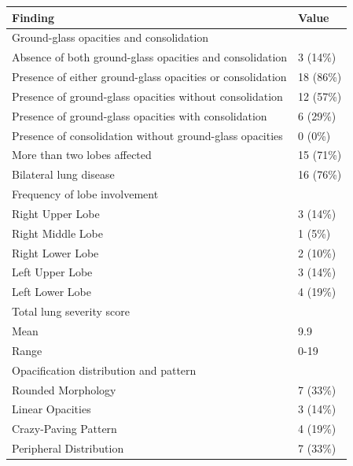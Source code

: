 \begin{longtable}{| p{} | p{} |} 
\hline
\textbf{Finding} & \textbf{Value} \\
\hline
Ground-glass opacities and consolidation & \\ \hline
\quad Absence of both ground-glass opacities and consolidation & 3 (14\%)\\ \hline
\quad Presence of either ground-glass opacities or consolidation & 18 (86\%)\\  \hline
\quad Presence of ground-glass opacities without consolidation & 12 (57\%)\\ \hline
\quad Presence of ground-glass opacities with consolidation & 6 (29\%)\\ \hline
\quad Presence of consolidation without ground-glass opacities & 0 (0\%)\\ \hline
More than two lobes affected & 15 (71\%)\\ \hline
Bilateral lung disease & 16 (76\%)\\ \hline
Frequency of lobe involvement & \\ \hline
\quad Right Upper Lobe & 3 (14\%)\\ \hline
\quad Right Middle Lobe & 1 (5\%)\\ \hline
\quad Right Lower Lobe & 2 (10\%)\\ \hline
\quad Left Upper Lobe & 3 (14\%)\\ \hline
\quad Left Lower Lobe & 4 (19\%)\\ \hline
Total lung severity score & \\ \hline
\quad Mean & 9.9\\ \hline
\quad Range & 0-19\\ \hline
Opacification distribution and pattern & \\ \hline
 \quad Rounded Morphology & 7 (33\%)\\ \hline
 \quad Linear Opacities & 3 (14\%)\\ \hline
 \quad Crazy-Paving Pattern & 4 (19\%)\\ \hline
 \quad Peripheral Distribution & 7 (33\%)\\ \hline
 

\end{longtable}
